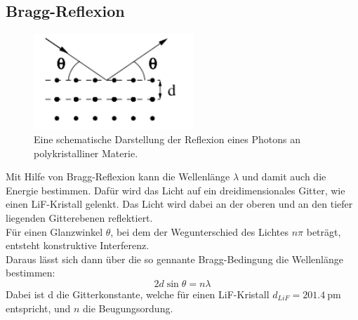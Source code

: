 \subsection{Bragg-Reflexion}

\begin{figure}
    \centering
    \includegraphics[width=6cm]{latex/images/bragg.PNG}
    \caption{Eine schematische Darstellung der Reflexion eines Photons an polykristalliner Materie\protect \cite{V602}.}
    \label{img:comp}
\end{figure}
Mit Hilfe von Bragg-Reflexion kann die Wellenlänge $\lambda$  und damit auch die Energie bestimmen.
Dafür wird das Licht auf ein dreidimensionales Gitter, wie einen LiF-Kristall gelenkt. Das Licht wird dabei an der oberen und an den tiefer liegenden Gitterebenen reflektiert.\\
Für einen Glanzwinkel $\theta$, bei dem der Wegunterschied des Lichtes $n\pi$ beträgt, entsteht konstruktive Interferenz.\\
Daraus lässt sich dann über die so gennante Bragg-Bedingung die Wellenlänge bestimmen:
\begin{equation*}
    2 d \sin \theta =n \lambda
\end{equation*}
Dabei ist d die Gitterkonstante, welche für einen LiF-Kristall $d_{LiF}=\SI{201.4}{\pico\metre}$ entspricht, und $n$ die Beugungsordung.
